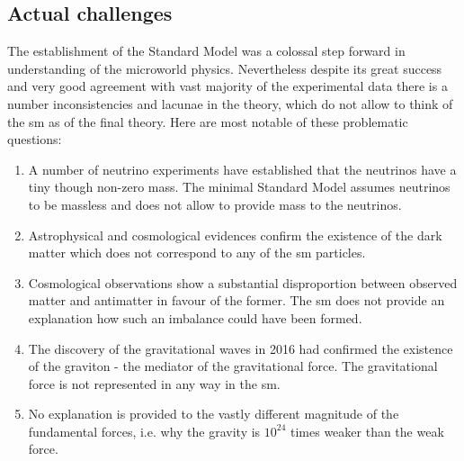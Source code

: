 \subsection{Actual challenges}

The establishment of the Standard Model was a colossal step forward in understanding of the microworld physics. Nevertheless despite its great success and very good agreement with vast majority of the experimental data there is a number inconsistencies and lacunae in the theory, which do not allow to think of the \gls{sm} as of the final theory. Here are most notable of these problematic questions:
\begin{enumerate}
	\item A number of neutrino experiments have established that the neutrinos have a tiny though non-zero mass. The minimal Standard Model assumes neutrinos to be massless and does not allow to provide mass to the neutrinos. 
	\item Astrophysical and cosmological evidences confirm the existence of the dark matter which does not correspond to any of the \gls{sm} particles. 
	\item Cosmological observations show a substantial disproportion between observed matter and antimatter in favour of the former. The \gls{sm} does not provide an explanation how such an imbalance could have been formed.
	\item The discovery of the gravitational waves in 2016 had confirmed the existence of the graviton - the mediator of the gravitational force. The gravitational force is not represented in any way in the \gls{sm}.
	\item No explanation is provided to the vastly different magnitude of the fundamental forces, i.e. why the gravity is $10^{24}$ times weaker than the weak force. 
\end{enumerate}

